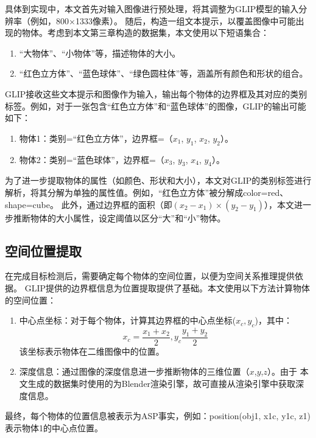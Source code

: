 具体到实现中，本文首先对输入图像进行预处理，将其调整为GLIP模型的输入分辨率（例如，800×1333像素）。
随后，构造一组文本提示，以覆盖图像中可能出现的物体。考虑到本文第三章构造的数据集，本文使用以下短语集合：
\begin{enumerate}[label=(\arabic*),itemsep=0pt,parsep=0pt]
    \item “大物体”、“小物体”等，描述物体的大小。
    \item “红色立方体”、“蓝色球体”、“绿色圆柱体”等，涵盖所有颜色和形状的组合。
\end{enumerate}
GLIP接收这些文本提示和图像作为输入，输出每个物体的边界框及其对应的类别标签。例如，对于一张包含“红色立方体”和“蓝色球体”的图像，GLIP的输出可能如下：
\begin{enumerate}
    \item 物体1：类别=“红色立方体”，边界框=（$x_1$, $y_1$, $x_2$, $y_2$）。
    \item 物体2：类别=“蓝色球体”，边界框=（$x_3$, $y_3$, $x_4$, $y_4$）。
\end{enumerate}

为了进一步提取物体的属性（如颜色、形状和大小），本文对GLIP的类别标签进行解析，将其分解为单独的属性值。例如，“红色立方体”被分解成color=red、shape=cube。
此外，通过边界框的面积（即$(x_2-x_1)\times (y_2-y_1)$），本文进一步推断物体的大小属性，设定阈值以区分“大”和“小”物体。
\subsection{空间位置提取}
在完成目标检测后，需要确定每个物体的空间位置，以便为空间关系推理提供依据。
GLIP提供的边界框信息为位置提取提供了基础。本文使用以下方法计算物体的空间位置：
\begin{enumerate}[label=(\arabic*),itemsep=0pt,parsep=0pt]
    \item 中心点坐标：对于每个物体，计算其边界框的中心点坐标($x_c, y_c$)，其中：
    $$x_c = \frac{x_1 + x_2}{2}, y_c \frac{y_1+y_2}{2}$$
    该坐标表示物体在二维图像中的位置。
    \item 深度信息：通过图像的深度信息进一步推断物体的三维位置（$x$,$y$,$z$）。由于
本文生成的数据集时使用的为Blender渲染引擎，故可直接从渲染引擎中获取深度信息。
\end{enumerate}

最终，每个物体的位置信息被表示为ASP事实，例如：position(obj1, x1c, y1c, z1) 表示物体1的中心点位置。

